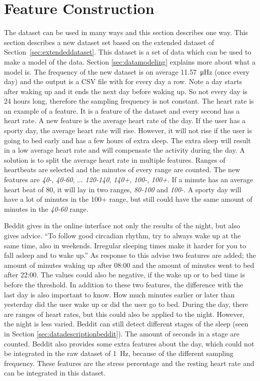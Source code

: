 	\section{Feature Construction}
		\label{sec:feature}
				The dataset can be used in many ways and this section describes one way. This section describes a new dataset set based on the extended dataset of Section~\ref{sec:extendeddataset}. This dataset is a set of data which can be used to make a model of the data. Section \ref{sec:datamodeling} explains more about what a model is. The frequency of the new dataset is on average \SI{11.57}{\micro\hertz} (once every day) and the output is a CSV file with for every day a row. Note a day starts after waking up and it ends the next day before waking up. So not every day is 24 hours long, therefore the sampling frequency is not constant. The heart rate is an example of a feature. It is a feature of the dataset and every second has a heart rate. A new feature is the average heart rate of the day. If the user has a sporty day, the average heart rate will rise. However, it will not rise if the user is going to bed early and has a few hours of extra sleep. The extra sleep will result in a low average heart rate and will compensate the activity during the day. A solution is to split the average heart rate in multiple features. Ranges of heartbeats are selected and the minutes of every range are counted. The new features are \emph{40-}, \emph{40-60}, ... \emph{120-140}, \emph{140+}, \emph{100-}, \emph{100+}. If a minute has an average heart beat of 80, it will lay in two ranges, \emph{80-100} and \emph{100-}. A sporty day will have a lot of minutes in the 100+ range, but still could have the same amount of minutes in the \emph{40-60} range. 

			Beddit gives in the online interface not only the results of the night, but also gives advice. ``To follow good circadian rhythm, try to always wake up at the same time, also in weekends. Irregular sleeping times make it harder for you to fall asleep and to wake up.'' As response to this advise two features are added; the amount of minutes waking up after 08:00 and the amount of minutes went to bed after 22:00. The values could also be negative, if the wake up or to bed time is before the threshold. In addition to these two features, the difference with the last day is also important to know. How much minutes earlier or later than yesterday did the user wake up or did the user go to bed. 
			During the day, there are ranges of heart rates, but this could also be applied to the night. However, the night is less varied. Beddit can still detect different stages of the sleep (seen in Section \ref{sec:datadescriptionbeddit}). The amount of seconds in a stage are counted.
			 Beddit also provides some extra features about the day, which could not be integrated in the raw dataset of \SI{1}{\hertz}, because of the different sampling frequency. These features are the stress percentage and the resting heart rate and can be integrated in this dataset.
				
